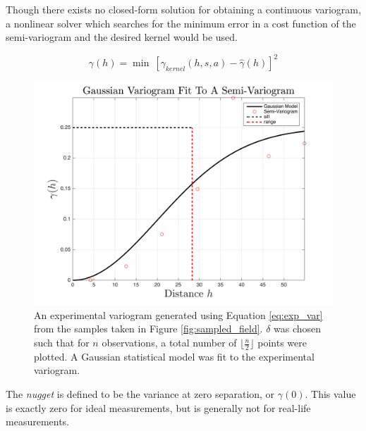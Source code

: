 Though there exists no closed-form solution for obtaining a continuous variogram, a nonlinear solver which searches for the minimum error in a cost function of the semi-variogram and the desired kernel would be used.

\begin{equation}
\gamma(h) = \min\ [\gamma_{kernel}(h,s,a) - \hat{\gamma}(h)]^2
\end{equation}


\begin{figure}[ht!]
    \centering    
	\includegraphics[width=\linewidth]{figures/fit_kernel.png}
	\caption{An experimental variogram generated using Equation \ref{eq:exp_var} from the samples taken in Figure \ref{fig:sampled_field}. $\delta$ was chosen such that for $n$ observations, a total number of $\Big\lfloor \frac{n}{2} \Big\rfloor$ points were plotted. A Gaussian statistical model was fit to the experimental variogram.}
	\label{fig:fit_kernel}
\end{figure}

The \textit{nugget} is defined to be the variance at zero separation, or $\gamma(0)$. This value is exactly zero for ideal measurements, but is generally not for real-life measurements.


